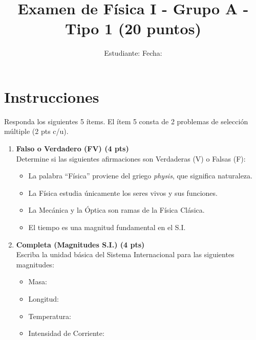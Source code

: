 \documentclass[a4paper,12pt]{article}
\title{Examen de Física I - Grupo A - Tipo 1 (20 puntos)}
\author{Estudiante: \underline{\hspace{6cm}} \quad Fecha: \underline{\hspace{3cm}}}
\date{}
\begin{document}
\maketitle

\section*{Instrucciones}
Responda los siguientes 5 ítems. El ítem 5 consta de 2 problemas de selección múltiple (2 pts c/u).

\begin{enumerate}[label=\textbf{Item \arabic*:}, leftmargin=*]

    \item \textbf{Falso o Verdadero (FV) (4 pts)} \\
    Determine si las siguientes afirmaciones son Verdaderas (V) o Falsas (F):
    \begin{itemize}
        \item[\underline{\hspace{1cm}}] La palabra ``Física'' proviene del griego \textit{physis}, que significa naturaleza.
        \item[\underline{\hspace{1cm}}] La Física estudia únicamente los seres vivos y sus funciones.
        \item[\underline{\hspace{1cm}}] La Mecánica y la Óptica son ramas de la Física Clásica.
        \item[\underline{\hspace{1cm}}] El tiempo es una magnitud fundamental en el S.I.
    \end{itemize}

    \item \textbf{Completa (Magnitudes S.I.) (4 pts)} \\
    Escriba la unidad básica del Sistema Internacional para las siguientes magnitudes:
    \begin{itemize}
        \item Masa: \underline{\hspace{4cm}}
        \item Longitud: \underline{\hspace{4cm}}
        \item Temperatura: \underline{\hspace{4cm}}
        \item Intensidad de Corriente: \underline{\hspace{3cm}}
    \end{itemize}


\end{enumerate}
\end{document}
